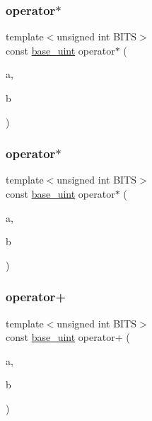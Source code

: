 \subsubsection{\texorpdfstring{operator$\ast$}{operator*}\hspace{0.1cm}{\footnotesize\ttfamily [1/2]}}
{\footnotesize\ttfamily template$<$unsigned int B\+I\+TS$>$ \\
const \mbox{\hyperlink{classbase__uint}{base\+\_\+uint}} operator$\ast$ (\begin{DoxyParamCaption}\item[{const \mbox{\hyperlink{classbase__uint}{base\+\_\+uint}}$<$ B\+I\+TS $>$ \&}]{a,  }\item[{const \mbox{\hyperlink{classbase__uint}{base\+\_\+uint}}$<$ B\+I\+TS $>$ \&}]{b }\end{DoxyParamCaption})\hspace{0.3cm}{\ttfamily [friend]}}

\mbox{\label{classbase__uint_a3490f0aef12712d434cda33f913b586f}} 
\subsubsection{\texorpdfstring{operator$\ast$}{operator*}\hspace{0.1cm}{\footnotesize\ttfamily [2/2]}}
{\footnotesize\ttfamily template$<$unsigned int B\+I\+TS$>$ \\
const \mbox{\hyperlink{classbase__uint}{base\+\_\+uint}} operator$\ast$ (\begin{DoxyParamCaption}\item[{const \mbox{\hyperlink{classbase__uint}{base\+\_\+uint}}$<$ B\+I\+TS $>$ \&}]{a,  }\item[{uint32\+\_\+t}]{b }\end{DoxyParamCaption})\hspace{0.3cm}{\ttfamily [friend]}}

\mbox{\label{classbase__uint_ab46abc7a4c02bbbe6ee4d44db58f36fd}} 
\subsubsection{\texorpdfstring{operator+}{operator+}}
{\footnotesize\ttfamily template$<$unsigned int B\+I\+TS$>$ \\
const \mbox{\hyperlink{classbase__uint}{base\+\_\+uint}} operator+ (\begin{DoxyParamCaption}\item[{const \mbox{\hyperlink{classbase__uint}{base\+\_\+uint}}$<$ B\+I\+TS $>$ \&}]{a,  }\item[{const \mbox{\hyperlink{classbase__uint}{base\+\_\+uint}}$<$ B\+I\+TS $>$ \&}]{b }\end{DoxyParamCaption})\hspace{0.3cm}{\ttfamily [friend]}}

